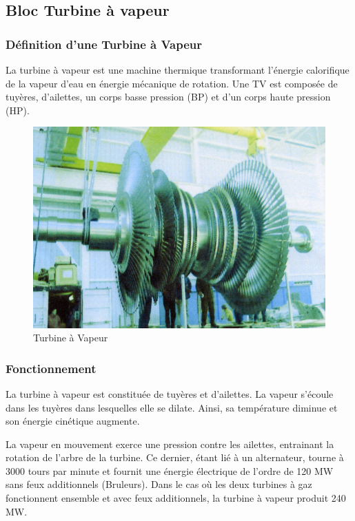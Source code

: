 \subsection{Bloc Turbine à vapeur}
\subsubsection{Définition d'une Turbine à Vapeur}
La turbine à vapeur est une machine thermique transformant l'énergie calorifique de la vapeur d'eau en énergie mécanique de rotation. Une TV est composée de tuyères, d'ailettes, un corps basse pression (BP) et d'un corps haute pression (HP).
\begin{figure}[hbtp]
 \centering
 \includegraphics[scale=0.5]{./Figures/TV.png}
 \caption{Turbine à Vapeur}
 \end{figure}

\subsubsection{Fonctionnement} 
La turbine à vapeur est constituée de tuyères et d'ailettes. La vapeur s'écoule dans les tuyères dans lesquelles elle se dilate. Ainsi, sa température diminue et son énergie cinétique augmente.

La vapeur en mouvement exerce une pression contre les ailettes, entrainant la rotation de l'arbre de la turbine. 
Ce dernier, étant lié à un alternateur, tourne à 3000 tours par minute et fournit une énergie électrique de l'ordre de 120 MW sans feux additionnels (Bruleurs). Dans le cas où les deux turbines à gaz fonctionnent ensemble et avec feux additionnels, la turbine à vapeur produit 240 MW.

